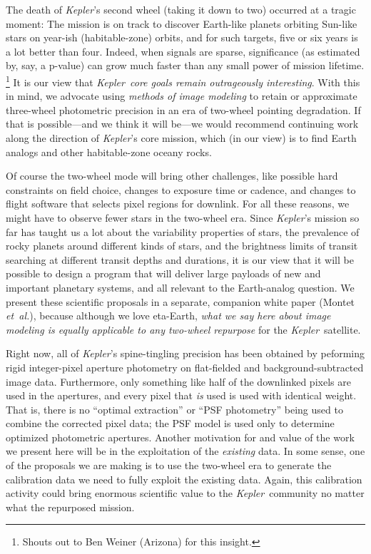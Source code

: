 \documentclass[letterpaper,12pt,preprint]{aastex}
\newcommand{\foreign}[1]{\textit{#1}}
\newcommand{\etal}{\foreign{et~al.}}
\newcommand{\observatory}[1]{\textsl{#1}}
\newcommand{\Kepler}{\observatory{Kepler}}
\begin{document}
The death of \Kepler's second wheel (taking it down to two)
  occurred at a tragic moment:
The mission is on track to discover Earth-like planets
  orbiting Sun-like stars on year-ish (habitable-zone) orbits,
  and for such targets, five or six years is a lot better than four.
Indeed, when signals are sparse, significance
  (as estimated by, say, a p-value)
  can grow much faster than any small power of mission lifetime.%
  \footnote{Shouts out to Ben Weiner (Arizona) for this insight.}
It is our view that \emph{\Kepler\ core goals remain outrageously interesting}.
With this in mind, we advocate using \emph{methods of image modeling} to retain
  or approximate three-wheel photometric precision
  in an era of two-wheel pointing degradation.
If that is possible---and we think it will be---we would recommend continuing work
  along the direction of \Kepler's core mission,
  which (in our view) is to find Earth analogs and other habitable-zone oceany rocks.

Of course the two-wheel mode will bring other challenges, like
  possible hard constraints on field choice,
  changes to exposure time or cadence,
  and changes to flight software that selects pixel regions for downlink.
For all these reasons, we might have to observe fewer stars in the two-wheel era.
Since \Kepler's mission so far has taught us a lot about the variability
  properties of stars,
  the prevalence of rocky planets around different kinds of stars,
  and the brightness limits of transit searching at different transit depths and durations,
  it is our view that it will be possible to design a program that will deliver
  large payloads of new and important planetary systems,
  and all relevant to the Earth-analog question.
We present these scientific proposals in a separate, companion white paper (Montet \etal),
  because although we love eta-Earth,
  \emph{what we say here about image modeling is equally applicable
  to any two-wheel repurpose} for the \Kepler\ satellite.

Right now, all of \Kepler's spine-tingling precision
  has been obtained by peforming rigid integer-pixel aperture photometry
  on flat-fielded and background-subtracted image data.
Furthermore, only something like half of the downlinked pixels are used in the apertures,
  and every pixel that \emph{is} used is used with identical weight.
That is, there is no ``optimal extraction'' or ``PSF photometry'' being
  used to combine the corrected pixel data;
  the PSF model is used only to determine optimized photometric apertures.
Another motivation for and value of the work we present here will be
  in the exploitation of the \emph{existing} data.
In some sense, one of the proposals we are making is to use the two-wheel era
  to generate the calibration data we need to fully exploit the existing data.
Again, this calibration activity could bring enormous scientific value to the \Kepler\ community
  no matter what the repurposed mission.
\end{document}
